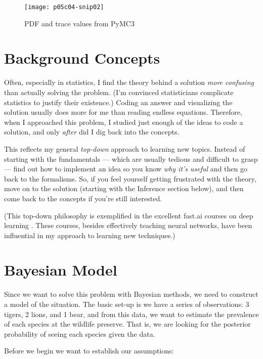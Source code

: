     \begin{figure*}[h]
        \texttt{[image: p05c04-snip02]}
        \caption{PDF and trace values from PyMC3}
        \label{fig:p05c04-snip02}
        \end{figure*}
    
\section{Background Concepts}

Often, especially in statistics, I find the theory behind a solution \textit{more confusing} than actually solving the problem. (I'm convinced statisticians complicate statistics to justify their existence.) Coding an answer and visualizing the solution usually does more for me than reading endless equations. Therefore, when I approached this problem, I studied just enough of the ideas to code a solution, and only \textit{after} did I dig back into the concepts.

This reflects my general \textit{top-down} \cite{RachelThomas2019} approach to learning new topics. Instead of starting with the fundamentals --- which are usually tedious and difficult to grasp --- find out how to implement an idea so you know \textit{why it's useful} and then go back to the formalisms. So, if you feel yourself getting frustrated with the theory, move on to the solution (starting with the Inference section below), and then come back to the concepts if you're still interested.

(This top-down philosophy is exemplified in the excellent fast.ai courses on deep learning \cite{RachelThomas2019}. These courses, besides effectively teaching neural networks, have been influential in my approach to learning new techniques.)

\section{Bayesian Model}

Since we want to solve this problem with Bayesian methods, we need to construct a model of the situation. The basic set-up is we have a series of observations: 3 tigers, 2 lions, and 1 bear, and from this data, we want to estimate the prevalence of each species at the wildlife preserve. That is, we are looking for the posterior probability of seeing each species given the data.

Before we begin we want to establish our assumptions:


